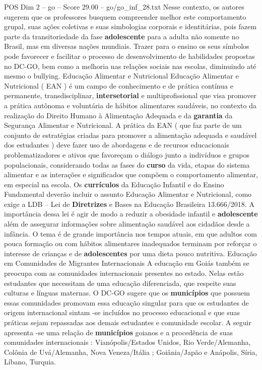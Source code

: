 \begin{textsample}{POS Dim 2 – go – Score 29.00 – go/go\_inf\_28.txt}
Nesse contexto, os autores sugerem que os professores busquem compreender melhor este comportamento grupal, suas ações coletivas e suas simbologias corporais e identitárias, pois fazem parte da transitoriedade da fase \textbf{adolescente} para a adulta não somente no Brasil, mas em diversas nações mundiais.
Trazer para o ensino os seus símbolos pode favorecer e facilitar o processo de desenvolvimento de habilidades propostas no DC-GO, bem como a melhoria nas relações sociais nas escolas, diminuindo até mesmo o bullying.
Educação Alimentar e Nutricional Educação Alimentar e Nutricional ( EAN ) é um campo de conhecimento e de prática contínua e permanente, transdisciplinar, \textbf{intersetorial} e multiprofissional que visa promover a prática autônoma e voluntária de hábitos alimentares saudáveis, no contexto da realização do Direito Humano à Alimentação Adequada e da \textbf{garantia} da Segurança Alimentar e Nutricional.
A prática da EAN ( que faz parte de um conjunto de estratégias criadas para promover a alimentação adequada e saudável dos estudantes ) deve fazer uso de abordagens e de recursos educacionais problematizadores e ativos que favoreçam o diálogo junto a indivíduos e grupos populacionais, considerando todas as fases do \textbf{curso} da vida, etapas do sistema alimentar e as interações e significados que compõem o comportamento alimentar, em especial na escola.
Os \textbf{currículos} da Educação Infantil e do Ensino Fundamental deverão incluir o assunto Educação Alimentar e Nutricional, como exige a LDB – Lei de \textbf{Diretrizes} e Bases na Educação Brasileira 13.666/2018.
A importância dessa lei é agir de modo a reduzir a obesidade infantil e \textbf{adolescente} além de assegurar informações sobre alimentação saudável aos cidadãos desde a infância.
O tema é de grande importância nos tempos atuais, em que adultos com pouca formação ou com hábitos alimentares inadequados terminam por reforçar o interesse de crianças e de \textbf{adolescentes} por uma dieta pouco nutritiva.
Educação em Comunidades de Migrantes Internacionais A educação em Goiás também se preocupa com as comunidades internacionais presentes no estado.
Nelas estão estudantes que necessitam de uma educação diferenciada, que respeite suas culturas e línguas maternas.
O DC-GO sugere que os \textbf{municípios} que possuem essas comunidades promovam essa educação singular para que os estudantes de origem internacional sintam -se incluídos no processo educacional e que suas práticas sejam repassadas aos demais estudantes e comunidade escolar.
A seguir apresenta -se uma relação de \textbf{municípios} goianos e a procedência de suas comunidades internacionais : Vianópolis/Estados Unidos, Rio Verde/Alemanha, Colônia de Uvá/Alemanha, Nova Veneza/Itália ; Goiânia/Japão e Anápolis, Síria, Líbano, Turquia.

\end{textsample}
